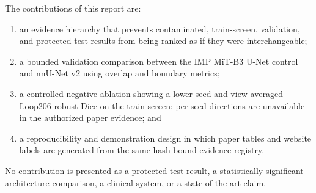 The contributions of this report are:

\begin{enumerate}
    \item an evidence hierarchy that prevents contaminated, train-screen, validation, and protected-test results from being ranked as if they were interchangeable;
    \item a bounded \cleanv{} validation comparison between the IMP MiT-B3 U-Net control and nnU-Net v2 using overlap and boundary metrics;
    \item a controlled negative ablation showing a lower seed-and-view-averaged Loop206 robust Dice on the train screen; per-seed directions are unavailable in the authorized paper evidence; and
    \item a reproducibility and demonstration design in which paper tables and website labels are generated from the same hash-bound evidence registry.
\end{enumerate}

No contribution is presented as a protected-test result, a statistically significant architecture comparison, a clinical system, or a state-of-the-art claim.
